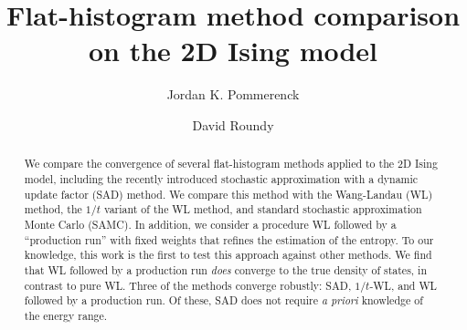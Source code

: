 \documentclass[letterpaper,twocolumn,amsmath,amssymb,pre,aps,10pt]{revtex4-1}
\begin{document}
\title{Flat-histogram method comparison on the 2D Ising model
}

\author{Jordan K. Pommerenck} \author{David Roundy}

\begin{abstract}
  We compare the convergence of several flat-histogram methods applied
  to the 2D Ising model, including the recently introduced stochastic
  approximation with a dynamic update factor (SAD) method.  We compare
  this method with the Wang-Landau (WL) method, the $1/t$ variant of
  the WL method, and standard stochastic approximation Monte Carlo
  (SAMC).  In addition, we consider a procedure WL followed by a
  ``production run'' with fixed weights that refines the estimation of
  the entropy.  To our knowledge, this work is the first to test this
  approach against other methods.
We find that WL followed by a production run \emph{does} converge to
the true density of states, in contrast to pure WL.  Three of the
methods converge robustly: SAD, $1/t$-WL, and WL followed by a
production run.  Of these, SAD does not require \emph{a priori}
knowledge of the energy range.
\end{abstract}

\maketitle



\end{document}
